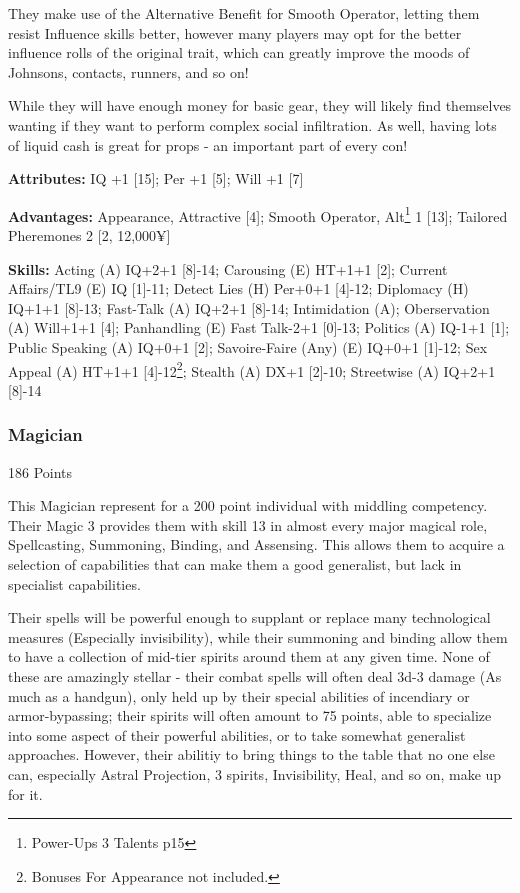 \begin{multicols*}{2}
	They make use of the Alternative Benefit for Smooth Operator, letting them resist Influence skills better, however many players may opt for the better influence rolls of the original trait, which can greatly improve the moods of Johnsons, contacts, runners, and so on!
	
	While they will have enough money for basic gear, they will likely find themselves wanting if they want to perform complex social infiltration. As well, having lots of liquid cash is great for props - an important part of every con!
	
	\textbf{Attributes: }
	IQ +1 [15]; Per +1 [5]; Will +1 [7]
	
	\textbf{Advantages: }
	Appearance, Attractive [4]; Smooth Operator, Alt\footnote{Power-Ups 3 Talents p15} 1 [13]; Tailored Pheremones 2 [2, 12,000¥]
	
	\textbf{Skills: } Acting (A) IQ+2+1 [8]-14; Carousing (E) HT+1+1 [2]; Current Affairs/TL9 (E) IQ [1]-11; Detect Lies (H) Per+0+1 [4]-12; Diplomacy (H) IQ+1+1 [8]-13; Fast-Talk (A) IQ+2+1 [8]-14; Intimidation (A); Oberservation (A) Will+1+1 [4]; Panhandling (E) Fast Talk-2+1 [0]-13; Politics (A) IQ-1+1 [1]; Public Speaking (A) IQ+0+1 [2]; Savoire-Faire (Any) (E) IQ+0+1 [1]-12; Sex Appeal (A) HT+1+1 [4]-12\footnote{Bonuses For Appearance not included.}; Stealth (A) DX+1 [2]-10; Streetwise (A) IQ+2+1 [8]-14
	
	
	\subsubsection{Magician}
	\begin{flushright}
		186 Points
	\end{flushright}
	
	This Magician represent for a 200 point individual with middling competency. Their Magic 3 provides them with skill 13 in almost every major magical role, Spellcasting, Summoning, Binding, and Assensing. This allows them to acquire a selection of capabilities that can make them a good generalist, but lack in specialist capabilities. 
	
	Their spells will be powerful enough to supplant or replace many technological measures (Especially invisibility), while their summoning and binding allow them to have a collection of mid-tier spirits around them at any given time. None of these are amazingly stellar - their combat spells will often deal 3d-3 damage (As much as a handgun), only held up by their special abilities of incendiary or armor-bypassing; their spirits will often amount to 75 points, able to specialize into some aspect of their powerful abilities, or to take somewhat generalist approaches. However, their abilitiy to bring things to the table that no one else can, especially Astral Projection, 3 spirits, Invisibility, Heal, and so on, make up for it.
	

\end{multicols*}
